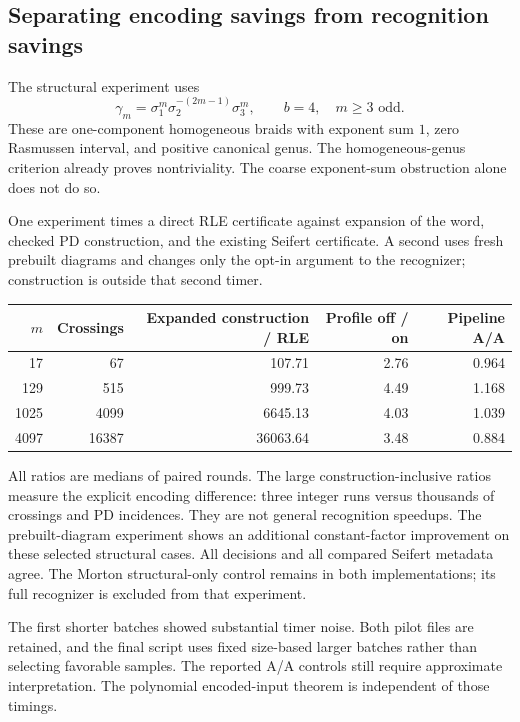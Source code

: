 \subsection{Separating encoding savings from recognition savings}

The structural experiment uses
\[
\gamma_m=\sigma_1^m\sigma_2^{-(2m-1)}\sigma_3^m,\qquad
b=4,\quad m\ge3\text{ odd}.
\]
These are one-component homogeneous braids with exponent sum \(1\),
zero Rasmussen interval, and positive canonical genus.
The homogeneous-genus criterion already proves nontriviality.
The coarse exponent-sum obstruction alone does not do so.

One experiment times a direct RLE certificate against expansion of
the word, checked PD construction, and the existing Seifert certificate.
A second uses fresh prebuilt diagrams and changes only the opt-in
 argument to the recognizer; construction is
outside that second timer.

\begin{center}
\small
\begin{tabular}{rrrrr}
\toprule
\(m\) & Crossings & Expanded construction / RLE &
Profile off / on & Pipeline A/A\\
\midrule
17 & 67 & 107.71 & 2.76 & 0.964\\
129 & 515 & 999.73 & 4.49 & 1.168\\
1025 & 4099 & 6645.13 & 4.03 & 1.039\\
4097 & 16387 & 36063.64 & 3.48 & 0.884\\
\bottomrule
\end{tabular}
\end{center}

All ratios are medians of paired rounds. The large construction-inclusive
ratios measure the explicit encoding difference: three integer runs
versus thousands of crossings and PD incidences. They are not general
recognition speedups. The prebuilt-diagram experiment shows an additional
constant-factor improvement on these selected structural cases.
All decisions and all compared Seifert metadata agree.
The Morton structural-only control remains  in
both implementations; its full recognizer is excluded from that
experiment.

The first shorter batches showed substantial timer noise. Both pilot
files are retained, and the final script uses fixed size-based larger
batches rather than selecting favorable samples.
The reported A/A controls still require approximate interpretation.
The polynomial encoded-input theorem is independent of those timings.
